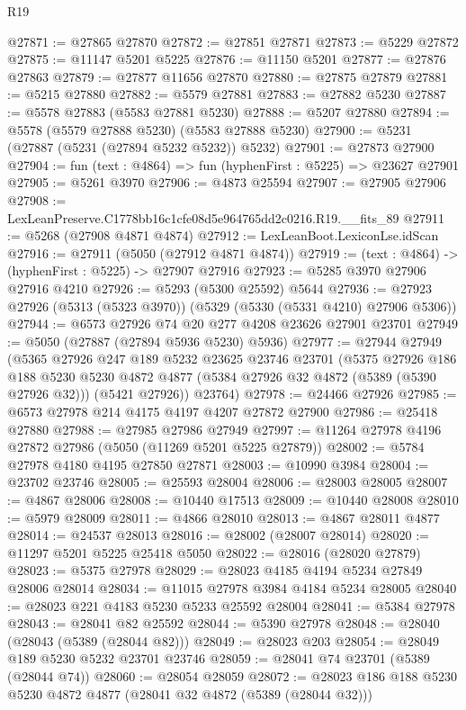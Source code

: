 \begin{lexlean}{R19}
\begin{coremodule}
@27871 := @27865 @27870
@27872 := @27851 @27871
@27873 := @5229 @27872
@27875 := @11147 @5201 @5225
@27876 := @11150 @5201
@27877 := @27876 @27863
@27879 := @27877 @11656 @27870
@27880 := @27875 @27879
@27881 := @5215 @27880
@27882 := @5579 @27881
@27883 := @27882 @5230
@27887 := @5578 @27883 (@5583 @27881 @5230)
@27888 := @5207 @27880
@27894 := @5578 (@5579 @27888 @5230) (@5583 @27888 @5230)
@27900 := @5231 (@27887 (@5231 (@27894 @5232 @5232)) @5232)
@27901 := @27873 @27900
@27904 := fun (text : @4864) => fun (hyphenFirst : @5225) => @23627 @27901
@27905 := @5261 @3970
@27906 := @4873 @25594
@27907 := @27905 @27906
@27908 := LexLeanPreserve.C1778bb16c1cfe08d5e964765dd2c0216.R19.__fits_89
@27911 := @5268 (@27908 @4871 @4874)
@27912 := LexLeanBoot.LexiconLse.idScan
@27916 := @27911 (@5050 (@27912 @4871 @4874))
@27919 := (text : @4864) -> (hyphenFirst : @5225) -> @27907 @27916
@27923 := @5285 @3970 @27906 @27916 @4210
@27926 := @5293 (@5300 @25592) @5644
@27936 := @27923 @27926 (@5313 (@5323 @3970)) (@5329 (@5330 (@5331 @4210) @27906 @5306))
@27944 := @6573 @27926 @74 @20 @277 @4208 @23626 @27901 @23701
@27949 := @5050 (@27887 (@27894 @5936 @5230) @5936)
@27977 := @27944
    @27949
    (@5365
      @27926
      @247
      @189
      @5232
      @23625
      @23746
      @23701
      (@5375
        @27926
        @186
        @188
        @5230
        @5230
        @4872
        @4877
        (@5384 @27926 @32 @4872 (@5389 (@5390 @27926 @32)))
        (@5421 @27926))
      @23764)
@27978 := @24466 @27926
@27985 := @6573 @27978 @214 @4175 @4197 @4207 @27872 @27900
@27986 := @25418 @27880
@27988 := @27985 @27986 @27949
@27997 := @11264 @27978 @4196 @27872 @27986 (@5050 (@11269 @5201 @5225 @27879))
@28002 := @5784 @27978 @4180 @4195 @27850 @27871
@28003 := @10990 @3984
@28004 := @23702 @23746
@28005 := @25593 @28004
@28006 := @28003 @28005
@28007 := @4867 @28006
@28008 := @10440 @17513
@28009 := @10440 @28008
@28010 := @5979 @28009
@28011 := @4866 @28010
@28013 := @4867 @28011 @4877
@28014 := @24537 @28013
@28016 := @28002 (@28007 @28014)
@28020 := @11297 @5201 @5225 @25418 @5050
@28022 := @28016 (@28020 @27879)
@28023 := @5375 @27978
@28029 := @28023 @4185 @4194 @5234 @27849 @28006 @28014
@28034 := @11015 @27978 @3984 @4184 @5234 @28005
@28040 := @28023 @221 @4183 @5230 @5233 @25592 @28004
@28041 := @5384 @27978
@28043 := @28041 @82 @25592
@28044 := @5390 @27978
@28048 := @28040 (@28043 (@5389 (@28044 @82)))
@28049 := @28023 @203
@28054 := @28049 @189 @5230 @5232 @23701 @23746
@28059 := @28041 @74 @23701 (@5389 (@28044 @74))
@28060 := @28054 @28059
@28072 := @28023 @186 @188 @5230 @5230 @4872 @4877 (@28041 @32 @4872 (@5389 (@28044 @32)))

\end{coremodule}
\end{lexlean}

